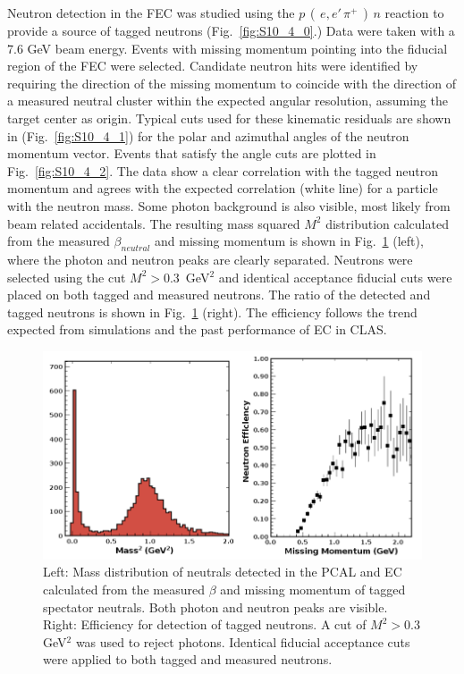 Neutron detection in the FEC was studied using the $p\,(\,e,e'\,\pi^+\,)\,n$ reaction to provide a source of tagged neutrons (Fig.~\ref{fig:S10_4_0}.) Data were taken with a 7.6 GeV beam energy.  Events with missing momentum pointing into the fiducial region of the FEC were selected.  Candidate neutron hits were identified by requiring the direction of the missing momentum to coincide with the direction of a measured neutral cluster within the expected angular resolution, assuming the target center as origin.  Typical cuts used for these kinematic residuals are shown in (Fig.~\ref{fig:S10_4_1}) for the polar and azimuthal angles of the neutron momentum vector.  Events that satisfy the angle cuts are plotted in Fig.~\ref{fig:S10_4_2}.  The data show a clear correlation with the tagged neutron momentum and agrees with the expected correlation (white line) for a particle with the neutron mass.  Some photon background is also visible, most likely from beam related accidentals. The resulting mass squared $M^2$ distribution calculated from the measured $\beta_{neutral}$ and missing momentum is shown in Fig.~\ref{fig:S10_4_3} (left), where the photon and neutron peaks are clearly separated.  Neutrons were selected using the cut $M^2 > 0.3$~GeV$^2$ and identical acceptance fiducial cuts were placed on both tagged and measured neutrons.  The ratio of the detected and tagged neutrons is shown in Fig.~\ref{fig:S10_4_3} (right).  The efficiency follows the trend expected from simulations and the past performance of EC in CLAS.     

\begin{figure}[h]
\centering
\includegraphics[width=1.0\columnwidth,keepaspectratio]{img/S10_4_3.png}
\caption[]{Left: Mass distribution of neutrals detected in the PCAL and EC calculated from the measured $\beta$ and missing momentum of tagged spectator neutrals.  Both photon and neutron peaks are visible. Right: Efficiency for detection of tagged neutrons.  A cut of $M^2>0.3$ GeV$^2$ was used to reject photons.  Identical fiducial acceptance cuts were applied to both tagged and measured neutrons.}
\label{fig:S10_4_3}
\end{figure}



